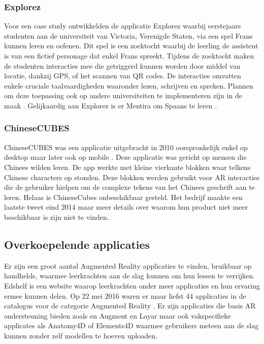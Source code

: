 \documentclass[pdftex,a4paper,12pt,twoside]{report}
\begin{document}
\subsubsection{Explorez}
 Voor een case study ontwikkelden \cite{perry2015gamifying} de applicatie Explorez waarbij eerstejaars studenten aan de universiteit van Victoria, Verenigde Staten, via een spel Frans kunnen leren en oefenen. Dit spel is een zoektocht waarbij de leerling de assistent is van een fictief personage dat enkel Frans spreekt. Tijdens de zoektocht maken de studenten interacties mee die getriggerd kunnen worden door middel van locatie, dankzij GPS, of het scannen van QR codes. De interacties omvatten enkele cruciale taalvaardigheden waaronder lezen, schrijven en spreken. Plannen om deze toepassing ook op andere universiteiten te implementeren zijn in de maak \cite{ perry2015gamifying}. Gelijkaardig aan Explorez is er Mentira om Spaans te leren \citep{mentira}.\\

\subsubsection{ChineseCUBES}
ChineseCUBES was een applicatie uitgebracht in 2010 oorspronkelijk enkel op desktop maar later ook op mobile \citep{chinesecubes}. Deze applicatie was gericht op mensen die Chinees wilden leren. De app werkte met kleine vierkante blokken waar telkens Chinese characters op stonden. Deze blokken werden gebruikt voor AR interacties die de gebruiker hielpen om de complexe tekens van het Chinees geschrift aan te leren. Helaas is ChineseCubes onbeschikbaar gesteld. Het bedrijf maakte een laatste tweet eind 2014 \citep{chinesetwitter} maar meer details over waarom hun product niet meer beschikbaar is zijn niet te vinden. \\


\subsection{Overkoepelende applicaties}
\label{sec:overkoepelend}
Er zijn een groot aantal Augmented Reality applicaties te vinden, bruikbaar op handhelds, waarmee leerkrachten aan de slag kunnen om hun lessen te verrijken. Edshelf is een website waarop leerkrachten onder meer applicaties en hun ervaring ermee kunnen delen. Op 22 mei 2016 waren er maar liefst 44 applicaties in de catalogus voor de categorie Augmented Reality \citep{Edshelf}. Er zijn applicaties die basis AR ondersteuning bieden zoals en Augment en Layar maar ook vakspecifieke applicates als Anatomy4D of Elements4D waarmee gebruikers meteen aan de slag kunnen zonder zelf modellen te hoeven uploaden. 
\end{document}
